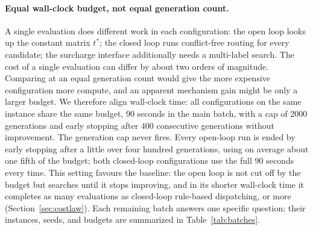 \paragraph{Equal wall-clock budget, not equal generation count.}
A single evaluation does different work in each configuration: the open loop looks up the constant matrix $t^{*}$; the closed loop runs conflict-free routing for every candidate; the surcharge interface additionally needs a multi-label search.
The cost of a single evaluation can differ by about two orders of magnitude. Comparing at an equal generation count would give the more expensive configuration more compute, and an apparent mechanism gain might be only a larger budget.
We therefore align wall-clock time: all configurations on the same instance share the same budget, $90$ seconds in the main batch, with a cap of $2000$ generations and early stopping after $400$ consecutive generations without improvement.
The generation cap never fires. Every open-loop run is ended by early stopping after a little over four hundred generations, using on average about one fifth of the budget; both closed-loop configurations use the full $90$ seconds every time.
This setting favours the baseline: the open loop is not cut off by the budget but searches until it stops improving, and in its shorter wall-clock time it completes as many evaluations as closed-loop rule-based dispatching, or more (Section~\ref{sec:costlaw}).
Each remaining batch answers one specific question; their instances, seeds, and budgets are summarized in Table~\ref{tab:batches}.


